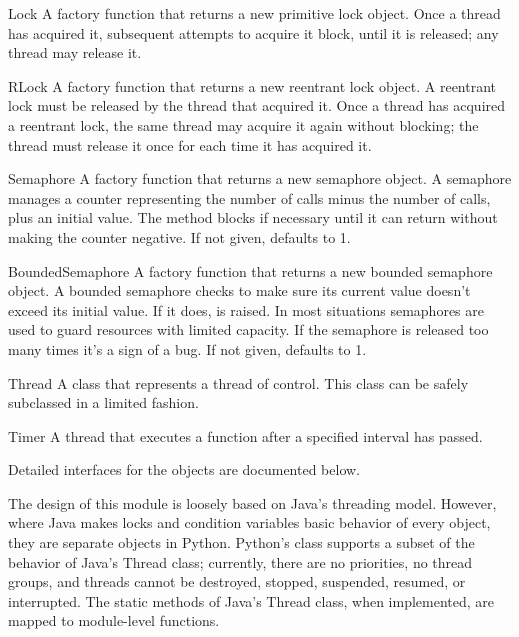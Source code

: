\begin{funcdesc}{Lock}{}
A factory function that returns a new primitive lock object.  Once
a thread has acquired it, subsequent attempts to acquire it block,
until it is released; any thread may release it.
\end{funcdesc}

\begin{funcdesc}{RLock}{}
A factory function that returns a new reentrant lock object.
A reentrant lock must be released by the thread that acquired it.
Once a thread has acquired a reentrant lock, the same thread may
acquire it again without blocking; the thread must release it once
for each time it has acquired it.
\end{funcdesc}

\begin{funcdesc}{Semaphore}{}
A factory function that returns a new semaphore object.  A
semaphore manages a counter representing the number of 
calls minus the number of  calls, plus an initial value.
The  method blocks if necessary until it can return
without making the counter negative.  If not given,  defaults to
1. 
\end{funcdesc}

\begin{funcdesc}{BoundedSemaphore}{}
A factory function that returns a new bounded semaphore object.  A bounded
semaphore checks to make sure its current value doesn't exceed its initial
value.  If it does,  is raised. In most situations
semaphores are used to guard resources with limited capacity.  If the
semaphore is released too many times it's a sign of a bug.  If not given,
 defaults to 1. 
\end{funcdesc}

\begin{classdesc*}{Thread}{}
A class that represents a thread of control.  This class can be safely subclassed in a limited fashion.
\end{classdesc*}

\begin{classdesc*}{Timer}{}
A thread that executes a function after a specified interval has passed.
\end{classdesc*}

Detailed interfaces for the objects are documented below.  

The design of this module is loosely based on Java's threading model.
However, where Java makes locks and condition variables basic behavior
of every object, they are separate objects in Python.  Python's 
class supports a subset of the behavior of Java's Thread class;
currently, there are no priorities, no thread groups, and threads
cannot be destroyed, stopped, suspended, resumed, or interrupted.  The
static methods of Java's Thread class, when implemented, are mapped to
module-level functions.

